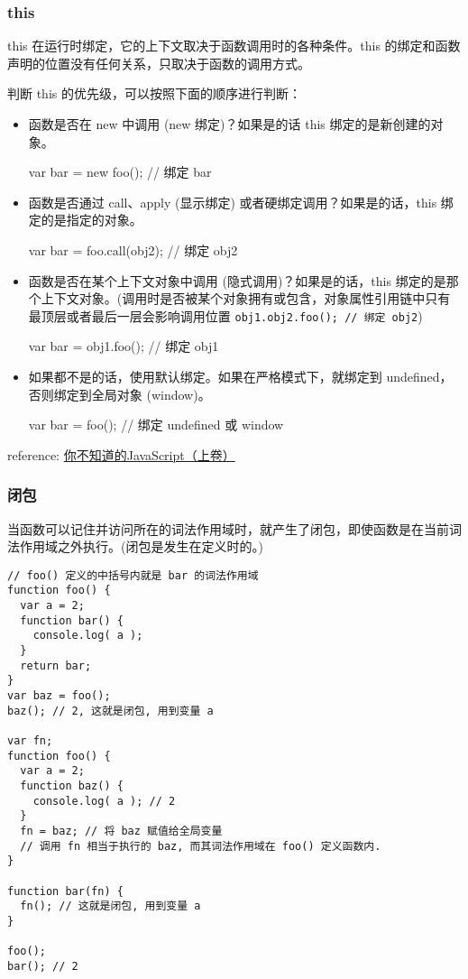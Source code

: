 \subsubsection{this}\hypertarget{this}{}\label{this}

this 在运行时绑定，它的上下文取决于函数调用时的各种条件。this 的绑定和函数声明的位置没有任何关系，只取决于函数的调用方式。

判断 this 的优先级，可以按照下面的顺序进行判断：

\begin{itemize}
\item 函数是否在 new 中调用 (new 绑定)？如果是的话 this 绑定的是新创建的对象。

var bar = new foo(); // 绑定 bar
\item 函数是否通过 call、apply (显示绑定) 或者硬绑定调用？如果是的话，this 绑定的是指定的对象。

var bar = foo.call(obj2); // 绑定 obj2
\item 函数是否在某个上下文对象中调用 (隐式调用)？如果是的话，this 绑定的是那个上下文对象。(调用时是否被某个对象拥有或包含，对象属性引用链中只有最顶层或者最后一层会影响调用位置 \texttt{obj1.obj2.foo(); // 绑定 obj2})

var bar = obj1.foo(); // 绑定 obj1
\item 如果都不是的话，使用默认绑定。如果在严格模式下，就绑定到 undefined，否则绑定到全局对象 (window)。

var bar = foo(); // 绑定 undefined 或 window
\end{itemize}

reference: \href{http://book.douban.com/subject/26351021/}{你不知道的JavaScript（上卷）}

\subsubsection{闭包}\hypertarget{section-5}{}\label{section-5}

当函数可以记住并访问所在的词法作用域时，就产生了闭包，即使函数是在当前词法作用域之外执行。(闭包是发生在定义时的。)

\begin{verbatim}// foo() 定义的中括号内就是 bar 的词法作用域
function foo() {
  var a = 2;
  function bar() {
    console.log( a );
  }
  return bar;
}
var baz = foo();
baz(); // 2, 这就是闭包, 用到变量 a

var fn;
function foo() {
  var a = 2;
  function baz() {
    console.log( a ); // 2
  }
  fn = baz; // 将 baz 赋值给全局变量
  // 调用 fn 相当于执行的 baz, 而其词法作用域在 foo() 定义函数内.
}

function bar(fn) {
  fn(); // 这就是闭包, 用到变量 a
}

foo();
bar(); // 2
\end{verbatim}

